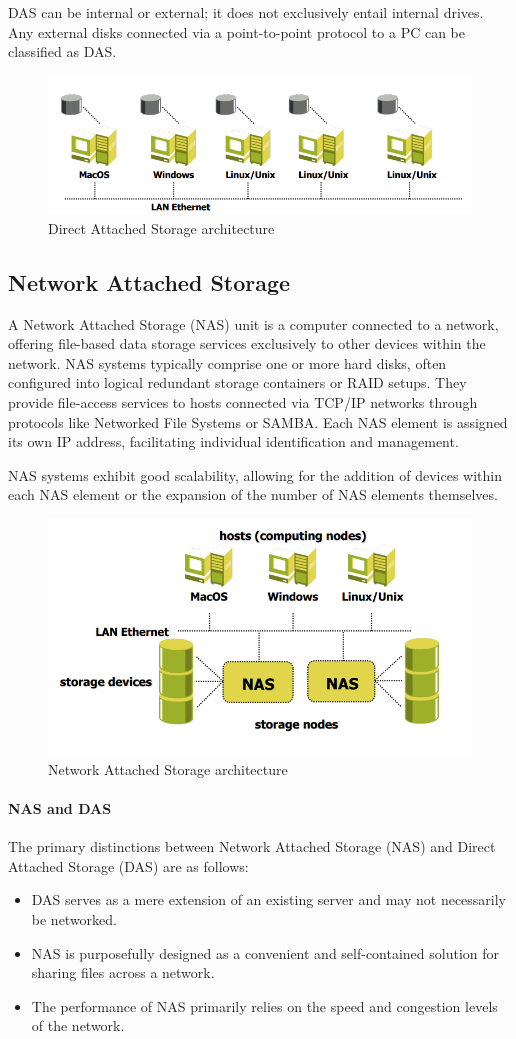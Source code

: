 DAS can be internal or external; it does not exclusively entail internal drives. 
Any external disks connected via a point-to-point protocol to a PC can be classified as DAS.
\begin{figure}[H]
    \centering
    \includegraphics[width=0.4\linewidth]{images/das.png}
    \caption{Direct Attached Storage architecture}
\end{figure}


\subsection{Network Attached Storage}
A Network Attached Storage (NAS) unit is a computer connected to a network, offering file-based data storage services exclusively to other devices within the network. 
NAS systems typically comprise one or more hard disks, often configured into logical redundant storage containers or RAID setups. 
They provide file-access services to hosts connected via TCP/IP networks through protocols like Networked File Systems or SAMBA. 
Each NAS element is assigned its own IP address, facilitating individual identification and management.

NAS systems exhibit good scalability, allowing for the addition of devices within each NAS element or the expansion of the number of NAS elements themselves.
\begin{figure}[H]
    \centering
    \includegraphics[width=0.4\linewidth]{images/nas.png}
    \caption{Network Attached Storage architecture}
\end{figure}

\paragraph*{NAS and DAS}
The primary distinctions between Network Attached Storage (NAS) and Direct Attached Storage (DAS) are as follows:
\begin{itemize}
    \item DAS serves as a mere extension of an existing server and may not necessarily be networked.
    \item NAS is purposefully designed as a convenient and self-contained solution for sharing files across a network.
    \item The performance of NAS primarily relies on the speed and congestion levels of the network.
\end{itemize}

